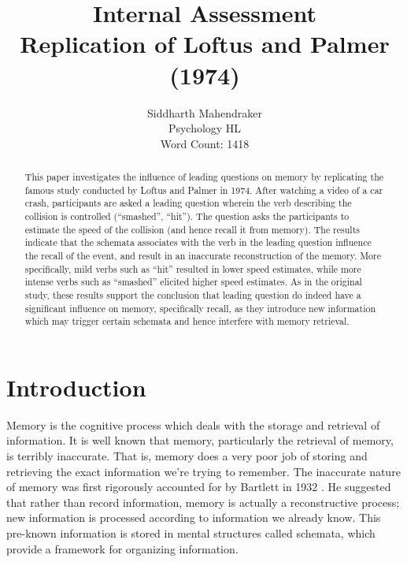 \documentclass[a4paper,twocolumn]{report}
\title{Internal Assessment\\
    Replication of Loftus and Palmer (1974)}
\author{Siddharth Mahendraker\\
    Psychology HL\\
    Word Count: 1418\\}
\begin{document}
\maketitle

\begin{abstract}
This paper investigates the influence of leading questions on memory by
replicating the famous study conducted by Loftus and Palmer in 1974. After
watching a video of a car crash, participants are asked a leading question
wherein the verb describing the collision is controlled (“smashed”, “hit”).
The question asks the participants to estimate the speed of the collision
(and hence recall it from memory). The results indicate that the schemata
associates with the verb in the leading question influence the recall of
the event, and result in an inaccurate reconstruction of the memory. More
specifically, mild verbs such as “hit” resulted in lower speed estimates,
while more intense verbs such as “smashed” elicited higher speed estimates.
As in the original study, these results support the conclusion that leading
question do indeed have a significant influence on memory, specifically
recall, as they introduce new information which may trigger certain schemata
and hence interfere with memory retrieval.
\end{abstract}

\setcounter{secnumdepth}{3}
\renewcommand{\thesection}{\arabic{section}}
\renewcommand{\cftsecfont}{\bfseries}
\setlength\cftbeforesecskip{3pt}
\setlength\cftbeforesubsecskip{3pt}

\newcommand{\fnt}[1]{%
\addtocounter{fn}{1}%
\footnote[\value{fn}]{#1}}

\setcounter{page}{1}
\tableofcontents
\clearpage
\setcounter{page}{1}

\section{Introduction}

Memory is the cognitive process which deals with the storage and retrieval
of information. It is well known that memory, particularly the retrieval of
memory, is terribly inaccurate. That is, memory does a very poor job of
storing and retrieving the exact information we’re trying to remember. The
inaccurate nature of memory was first rigorously accounted for by Bartlett
in 1932 \cite{bartlett}. He suggested that rather than record information,
memory is actually a reconstructive process; new information is processed
according to information we already know. This pre-known information is
stored in mental structures called schemata, which provide a framework for
organizing information.
\end{document}
